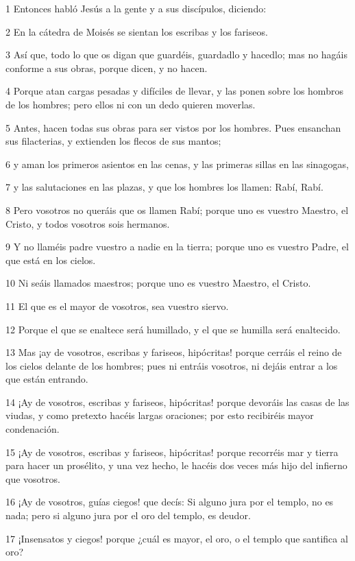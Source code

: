 \par 1 Entonces habló Jesús a la gente y a sus discípulos, diciendo:
\par 2 En la cátedra de Moisés se sientan los escribas y los fariseos.
\par 3 Así que, todo lo que os digan que guardéis, guardadlo y hacedlo; mas no hagáis conforme a sus obras, porque dicen, y no hacen.
\par 4 Porque atan cargas pesadas y difíciles de llevar, y las ponen sobre los hombros de los hombres; pero ellos ni con un dedo quieren moverlas.
\par 5 Antes, hacen todas sus obras para ser vistos por los hombres. Pues ensanchan sus filacterias, y extienden los flecos de sus mantos;
\par 6 y aman los primeros asientos en las cenas, y las primeras sillas en las sinagogas,
\par 7 y las salutaciones en las plazas, y que los hombres los llamen: Rabí, Rabí.
\par 8 Pero vosotros no queráis que os llamen Rabí; porque uno es vuestro Maestro, el Cristo, y todos vosotros sois hermanos.
\par 9 Y no llaméis padre vuestro a nadie en la tierra; porque uno es vuestro Padre, el que está en los cielos.
\par 10 Ni seáis llamados maestros; porque uno es vuestro Maestro, el Cristo.
\par 11 El que es el mayor de vosotros, sea vuestro siervo.
\par 12 Porque el que se enaltece será humillado, y el que se humilla será enaltecido.
\par 13 Mas ¡ay de vosotros, escribas y fariseos, hipócritas! porque cerráis el reino de los cielos delante de los hombres; pues ni entráis vosotros, ni dejáis entrar a los que están entrando.
\par 14 ¡Ay de vosotros, escribas y fariseos, hipócritas! porque devoráis las casas de las viudas, y como pretexto hacéis largas oraciones; por esto recibiréis mayor condenación.
\par 15 ¡Ay de vosotros, escribas y fariseos, hipócritas! porque recorréis mar y tierra para hacer un prosélito, y una vez hecho, le hacéis dos veces más hijo del infierno que vosotros.
\par 16 ¡Ay de vosotros, guías ciegos! que decís: Si alguno jura por el templo, no es nada; pero si alguno jura por el oro del templo, es deudor.
\par 17 ¡Insensatos y ciegos! porque ¿cuál es mayor, el oro, o el templo que santifica al oro?
